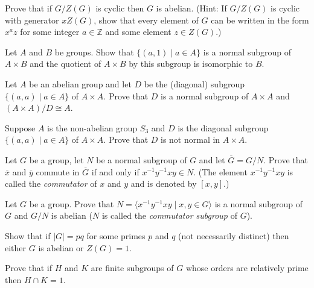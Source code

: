\documentclass[
    11pt,a4paper,
]{exam}
\begin{document}
\begin{questions}
\question
Prove that if $G / Z(G)$ is cyclic then $G$ is abelian. (Hint: If $G / Z(G)$ is cyclic with generator $xZ(G)$, show that every element of $G$ can be written in the form $x^a z$ for some integer $a \in \mathbb{Z}$ and some element $z \in Z(G)$.)




\question
Let $A$ and $B$ be groups. Show that $\{(a, 1) \mid a \in A\}$ is a normal subgroup of $A \times B$ and the quotient of $A \times B$ by this subgroup is isomorphic to $B$.







\question
Let $A$ be an abelian group and let $D$ be the (diagonal) subgroup $\{(a, a) \mid a \in A\}$ of $A \times A$. Prove that $D$ is a normal subgroup of $A \times A$ and $(A \times A)/D \cong A$.







\question
Suppose $A$ is the non-abelian group $S_3$ and $D$ is the diagonal subgroup $\{(a, a) \mid a \in A\}$ of $A \times A$. Prove that $D$ is not normal in $A \times A$.









\question 
Let $G$ be a group, let $N$ be a normal subgroup of $G$ and let $\overline{G} = G/N$. Prove that $\overline{x}$ and $\overline{y}$ commute in $\overline{G}$ if and only if $x^{-1} y^{-1} x y \in N$. (The element $x^{-1} y^{-1} x y$ is called the \textit{commutator} of $x$ and $y$ and is denoted by $[x, y]$.)

\question 
Let $G$ be a group. Prove that $N = \langle x^{-1} y^{-1} x y \mid x, y \in G \rangle$ is a normal subgroup of $G$ and $G / N$ is abelian ($N$ is called the \textit{commutator subgroup} of $G$).




\question 
Show that if $|G| = pq$ for some primes $p$ and $q$ (not necessarily distinct) then either $G$ is abelian or $Z(G) = 1$.


\question 
Prove that if $H$ and $K$ are finite subgroups of $G$ whose orders are relatively prime then $H \cap K = 1$.






\end{questions}
\end{document}

